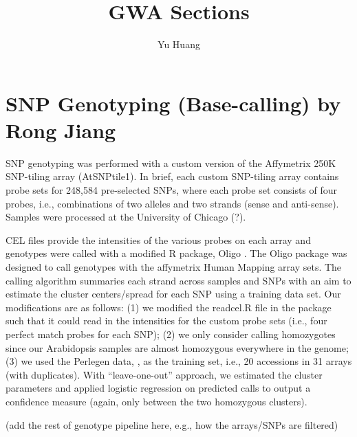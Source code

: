 \documentclass[a4paper,10pt]{article}
\title{GWA Sections}
\author{Yu Huang}
\begin{document}
\maketitle

\begin{abstract}

\end{abstract}

\tableofcontents

\section{SNP Genotyping (Base-calling) by Rong Jiang}
SNP genotyping was performed with a custom version of the Affymetrix 250K SNP-tiling array (AtSNPtile1).  In brief, each custom SNP-tiling array contains probe sets for 248,584 pre-selected SNPs, where each probe set consists of four probes, i.e., combinations of two alleles and two strands (sense and anti-sense).  Samples were processed at the University of Chicago (?).

CEL files provide the intensities of the various probes on each array and genotypes were called with a modified R package, Oligo \cite{Carvalho2007}.  The Oligo package was designed to call genotypes with the affymetrix Human Mapping array sets.  The calling algorithm summaries each strand across samples and SNPs with an aim to estimate the cluster centers/spread for each SNP using a training data set.  Our modifications are as follows: (1) we modified the readcel.R file in the package such that it could read in the intensities for the custom probe sets (i.e., four perfect match probes for each SNP); (2) we only consider calling homozygotes since our Arabidopsis samples are almost homozygous everywhere in the genome; (3) we used the Perlegen data, \cite{Clark2007a}, as the training set, i.e., 20 accessions in 31 arrays (with duplicates). With “leave-one-out” approach, we estimated the cluster parameters and applied logistic regression on predicted calls to output a confidence measure (again, only between the two homozygous clusters).

(add the rest of genotype pipeline here, e.g., how the arrays/SNPs are filtered)
\end{document}
